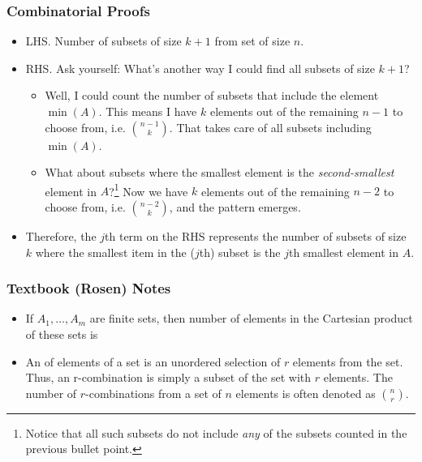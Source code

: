 \documentclass[12pt]{article}
\newcommand{\myspace}{\vspace{2\bigskipamount}}
\newcommand\p{\Needspace{12\baselineskip} \noindent}
\begin{document}
\subsubsection{Combinatorial Proofs}

\p {}
\begin{itemize}
	\item LHS. Number of subsets of size $k + 1$ from set of size $n$. 
	\item RHS. Ask yourself: What's another way I could find all subsets of size $k+1$? 
	\begin{itemize}
		\item Well, I could count the number of subsets that include the element $\min(A)$. This means I have $k$ elements out of the remaining $n-1$ to choose from, i.e. $\binom{n-1}{k}$. That takes care of all subsets including $\min(A)$. 
		\item What about subsets where the smallest element is the \textit{second-smallest} element in $A$?\footnote{Notice that all such subsets do not include \textit{any} of the subsets counted in the previous bullet point.} Now we have $k$ elements out of the remaining $n-2$ to choose from, i.e. $\binom{n-2}{k}$, and the pattern emerges. 
	\end{itemize}
	\item Therefore, the $j$th term on the RHS represents the number of subsets of size $k$ where the smallest item in the ($j$th) subset is the $j$th smallest element in $A$. 
\end{itemize}

\subsubsection{Textbook (Rosen) Notes}
\begin{itemize}
	\item If $A_1, \ldots, A_m$ are finite sets, then number of elements in the Cartesian product of these sets is 
	
	\item An  of elements of a set is an unordered selection of $r$ elements from the set. Thus, an r-combination is simply a subset of the set with $r$ elements. The number of $r$-combinations from a set of $n$ elements is often denoted as $\binom{n}{r}$. 
\end{itemize}
\myspace
	
\end{document}
